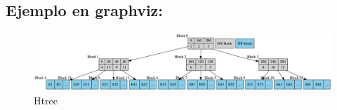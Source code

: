 \documentclass[]{article}
\begin{document}
	\subsection{Ejemplo en graphviz:}
		\begin{figure}[H]
			\centering\includegraphics[width=\textwidth]{graphviz/htree.png}
			\caption{Htree}
			\label{fig:Htree}
		\end{figure}
	

		
\newpage
\printbibliography
\end{document}
